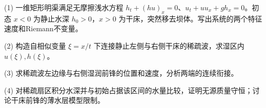 (1) 一维矩形明渠满足无摩擦浅水方程 \(h_t+(hu)_x=0\)、\(u_t+uu_x+gh_x=0\)。初态 \(x<0\) 为静止水深 \(h_0>0\)，\(x>0\) 为干床，突然移去坝体。写出系统的两个特征速度和Riemann不变量。

(2) 构造自相似变量 \(\xi=x/t\) 下连接静止左侧与右侧干床的稀疏波，求湿区内 \(u(\xi),h(\xi)\)。

(3) 求稀疏波左边缘与右侧湿润前锋的位置和速度，分析两端的连续衔接。

(4) 对稀疏扇区积分水深并与初始占据该区间的水量比较，证明无源质量守恒；讨论干床前锋的薄水层模型限制。
